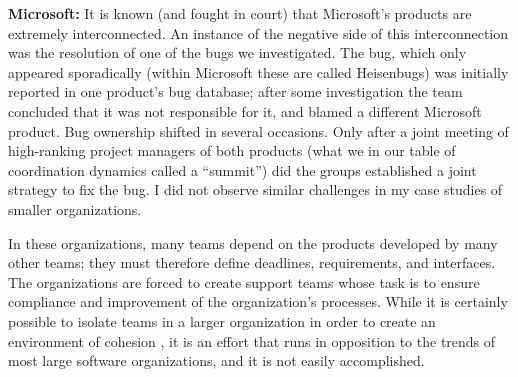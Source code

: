{\par \textbf{Microsoft:} It is known (and fought in court) that Microsoft's products are extremely interconnected. An instance of the negative side of this interconnection was the resolution of one of the bugs we investigated. The bug, which only appeared sporadically (within Microsoft these are called Heisenbugs) was initially reported in one product's bug database; after some investigation the team concluded that it was not responsible for it, and blamed a different Microsoft product. Bug ownership shifted in several occasions. Only after a joint meeting of high-ranking project managers of both products (what we in our table of coordination dynamics called a ``summit'') did the groups established a joint strategy to fix the bug. I did not observe similar challenges in my case studies of smaller organizations.} In these organizations, many teams depend on the products developed by many other teams; they must therefore define deadlines, requirements, and interfaces. The organizations are forced to create support teams whose task is to ensure compliance and improvement of the organization's processes. While it is certainly possible to isolate teams in a larger organization in order to create an environment of cohesion \cite{Teasley2002,Schwaber2001}, it is an effort that runs in opposition to the trends of most large software organizations, and it is not easily accomplished.

